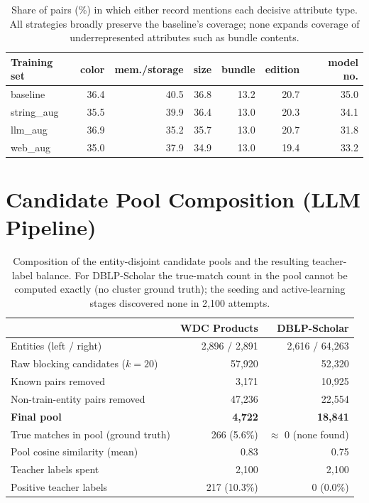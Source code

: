\documentclass[a4paper,oneside,bibliography=totoc]{scrbook}
\begin{document}
\begin{table}[!htbp]
  \centering
  \begin{tabular}{lrrrrrr}
    \toprule
    \textbf{Training set} & \textbf{color} & \textbf{mem./storage} & \textbf{size} & \textbf{bundle} & \textbf{edition} & \textbf{model no.} \\
    \midrule
    baseline & 36.4 & 40.5 & 36.8 & 13.2 & 20.7 & 35.0 \\
    string\_aug & 35.5 & 39.9 & 36.4 & 13.0 & 20.3 & 34.1 \\
    llm\_aug & 36.9 & 35.2 & 35.7 & 13.0 & 20.7 & 31.8 \\
    web\_aug & 35.0 & 37.9 & 34.9 & 13.0 & 19.4 & 33.2 \\
    \bottomrule
  \end{tabular}
  \caption{Share of pairs (\%) in which either record mentions each decisive attribute type. All strategies broadly preserve the baseline's coverage; none expands coverage of underrepresented attributes such as bundle contents.}
  \label{tab:coverage}
\end{table}

\section{Candidate Pool Composition (LLM Pipeline)}
\label{app:pool}

\begin{table}[!htbp]
  \centering
  \begin{tabular}{lrr}
    \toprule
    & \textbf{WDC Products} & \textbf{DBLP-Scholar} \\
    \midrule
    Entities (left / right) & 2{,}896 / 2{,}891 & 2{,}616 / 64{,}263 \\
    Raw blocking candidates ($k{=}20$) & 57{,}920 & 52{,}320 \\
    Known pairs removed & 3{,}171 & 10{,}925 \\
    Non-train-entity pairs removed & 47{,}236 & 22{,}554 \\
    \textbf{Final pool} & \textbf{4{,}722} & \textbf{18{,}841} \\
    True matches in pool (ground truth) & 266 (5.6\%) & $\approx$ 0 (none found) \\
    Pool cosine similarity (mean) & 0.83 & 0.75 \\
    Teacher labels spent & 2{,}100 & 2{,}100 \\
    Positive teacher labels & 217 (10.3\%) & 0 (0.0\%) \\
    \bottomrule
  \end{tabular}
  \caption{Composition of the entity-disjoint candidate pools and the resulting teacher-label balance. For DBLP-Scholar the true-match count in the pool cannot be computed exactly (no cluster ground truth); the seeding and active-learning stages discovered none in 2{,}100 attempts.}
  \label{tab:pool}
\end{table}
\end{document}
